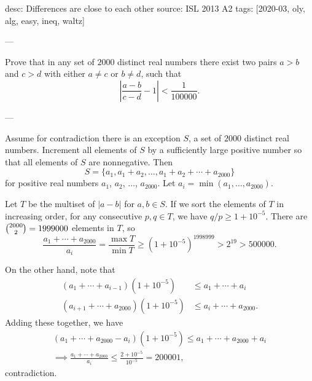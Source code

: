 desc: Differences are close to each other
source: ISL 2013 A2
tags: [2020-03, oly, alg, easy, ineq, waltz]

---

Prove that in any set of $2000$ distinct real numbers there exist two pairs $a>b$ and $c>d$ with either $a\ne c$ or $b\ne d$, such that \[\left\lvert\frac{a-b}{c-d}-1\right\rvert<\frac 1{100000}.\]

---

Assume for contradiction there is an exception $S$, a set of $2000$ distinct real numbers. Increment all elements of $S$ by a sufficiently large positive number so that all elements of $S$ are nonnegative. Then \[S=\{a_1,a_1+a_2,\ldots,a_1+a_2+\cdots+a_{2000}\}\]
for positive real numbers $a_1$, $a_2$, $\ldots$, $a_{2000}$. Let $a_i=\min(a_1,\ldots,a_{2000})$.

Let $T$ be the multiset of $|a-b|$ for $a,b\in S$. If we sort the elements of $T$ in increasing order, for any consecutive $p,q\in T$, we have $q/p\ge1+10^{-5}$. There are $\tbinom{2000}2=1999000$ elements in $T$, so \[\frac{a_1+\cdots+a_{2000}}{a_i}=\frac{\max T}{\min T}\ge\left(1+10^{-5}\right)^{1998999}>2^{19}>500000.\]

On the other hand, note that
\begin{align*}
    (a_1+\cdots+a_{i-1})\left(1+10^{-5}\right)&\le a_1+\cdots+a_i\\
    (a_{i+1}+\cdots+a_{2000})\left(1+10^{-5}\right)&\le a_i+\cdots+a_{2000}.
\end{align*}
Adding these together, we have
\begin{align*}
    (a_1+\cdots+a_{2000}-a_i)\left(1+10^{-5}\right)\le a_1+\cdots+a_{2000}+a_i\\
    \implies\frac{a_1+\cdots+a_{2000}}{a_i}\le\frac{2+10^{-5}}{10^{-5}}=200001,
\end{align*}
contradiction.
